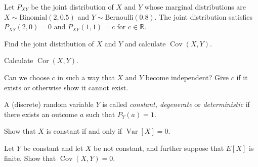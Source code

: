 \documentclass[a4paper,10pt,landscape,twocolumn]{scrartcl}
\DeclareMathOperator{\Cov}{Cov}
\DeclareMathOperator{\Cor}{Cor}
\DeclareMathOperator{\Var}{Var}
\begin{document}
\begin{exercise}[3pt]
Let $P_{XY}$ be the joint distribution of $X$ and $Y$ whose marginal distributions are $X \sim \text{Binomial}(2, 0.5)$ and $Y \sim \text{Bernoulli}(0.8)$. The joint distribution satisfies $P_{XY}(2,0) = 0$ and $P_{XY}(1,1) = c$ for $c\in \mathbb R$.

	\begin{subex}[1pt]
	Find the joint distribution of $X$ and $Y$ and calculate $\Cov(X,Y)$.
	\end{subex}
	
	\begin{subex}[1pt]
	Calculate $\Cor(X,Y)$.	
	\end{subex}
	
	\begin{subex}[1pt]
	Can we choose $c$ in such a way that $X$ and $Y$ become independent?	 Give $c$ if it exists or otherwise show it cannot exist.
	\end{subex}
\end{exercise}


\begin{exercise}
A (discrete) random variable $Y$ is called \emph{constant, degenerate} or \emph{deterministic} if there exists an outcome $a$ such that $P_Y(a) = 1$. 

	\begin{subex}[1pt]
		Show that $X$ is constant if and only if $\Var[X] = 0$.	
	\end{subex}
	
	\begin{subex}[1pt]
		Let $Y$ be constant and let $X$ be not constant, and further suppose that $E[X]$ is finite. Show that $\Cov(X,Y) = 0$.	
	\end{subex}
\end{exercise}


\end{document}
